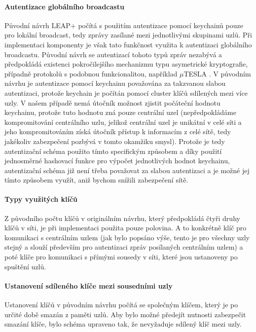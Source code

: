 \documentclass[11pt,final,twoside]{fithesis2}
\begin{document}
\paragraph{Autentizace globálního broadcastu}
Původní návrh LEAP+ počítá s použitím autentizace pomocí keychainů pouze pro lokální broadcast, tedy zprávy zasílané mezi jednotlivými skupinami uzlů. Při implementaci komponenty je však tato funkčnost 
využita k autentizaci globálního broadcastu. Původní návrh se autentizací tohoto typů zpráv nezabývá a předpokládá existenci pokročilejšího mechanizmu typu asymetrické kryptografie, případně protokolů
s podobnou funkcionalitou, například $\mu$TESLA \cite{Perrig2001}. V původním návrhu je autentizace pomocí keychainu považována za takzvanou slabou autentizaci, protože keychain je počítán pomocí 
cluster klíčů sdílených mezi více uzly. V našem případě nemá útočník možnost zjistit počáteční hodnotu keychainu, protože tuto hodnotu zná pouze centrální uzel (nepředpokládáme kompromitování centrálního
uzlu, jelikož centrální uzel je unikátní v celé síti a jeho kompromitováním získá útočník přístup k informacím z celé sítě, tedy jakékoliv zabezpečení pozbývá v tomto okamžiku smysl). Protože je tedy 
autentizační schéma použito tímto specifickým způsobem a díky použití jednosměrné hashovací funkce pro výpočet jednotlivých hodnot keychainu, autentizační schéma již není třeba považovat za slabou 
autentizaci a je možné jej tímto způsobem využít, aniž bychom snížili zabezpečení sítě.

\paragraph{Typy využitých klíčů}
Z původního počtu klíčů v originálním návrhu, který předpokládá čtyři druhy klíčů v síti, je při implementaci použita pouze polovina. A to konkrétně klíč pro komunikaci s centrálním uzlem (jak bylo popsáno 
výše, tento je pro všechny uzly stejný a slouží především pro autentizaci zpráv posílaných centrálním uzlem) a poté klíče pro komunikaci s přímými sousedy v síti, které jsou ustanoveny po spuštění uzlů. 

\paragraph{Ustanovení sdíleného klíče mezi sousedními uzly}
Ustanovení klíčů v původním návrhu počítá se společným klíčem, který je po určité době smazán z paměti uzlů. Aby bylo možné předejít nutnosti zabezpečit smazání klíče, bylo schéma upraveno tak, 
že nevyžaduje sdílený klíč mezi uzly. 
\end{document}
